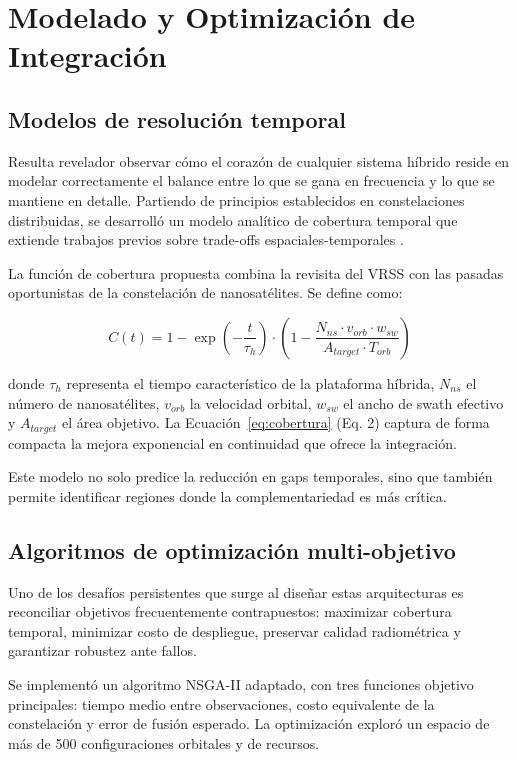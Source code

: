 \section{Modelado y Optimización de Integración}

\subsection{Modelos de resolución temporal}

Resulta revelador observar cómo el corazón de cualquier sistema híbrido reside en modelar correctamente el balance entre lo que se gana en frecuencia y lo que se mantiene en detalle. Partiendo de principios establecidos en constelaciones distribuidas, se desarrolló un modelo analítico de cobertura temporal que extiende trabajos previos sobre trade-offs espaciales-temporales \cite{BussyVirat2018}.

La función de cobertura propuesta combina la revisita del VRSS con las pasadas oportunistas de la constelación de nanosatélites. Se define como:

\begin{equation}
C(t) = 1 - \exp\left(-\frac{t}{\tau_{h}}\right) \cdot \left(1 - \frac{N_{ns} \cdot v_{orb} \cdot w_{sw}}{A_{target} \cdot T_{orb}}\right)
\label{eq:cobertura}
\end{equation}

donde $\tau_{h}$ representa el tiempo característico de la plataforma híbrida, $N_{ns}$ el número de nanosatélites, $v_{orb}$ la velocidad orbital, $w_{sw}$ el ancho de swath efectivo y $A_{target}$ el área objetivo. La Ecuación~\eqref{eq:cobertura} (Eq. 2) captura de forma compacta la mejora exponencial en continuidad que ofrece la integración.

Este modelo no solo predice la reducción en gaps temporales, sino que también permite identificar regiones donde la complementariedad es más crítica.

\subsection{Algoritmos de optimización multi-objetivo}

Uno de los desafíos persistentes que surge al diseñar estas arquitecturas es reconciliar objetivos frecuentemente contrapuestos: maximizar cobertura temporal, minimizar costo de despliegue, preservar calidad radiométrica y garantizar robustez ante fallos. 

Se implementó un algoritmo NSGA-II adaptado, con tres funciones objetivo principales: tiempo medio entre observaciones, costo equivalente de la constelación y error de fusión esperado. La optimización exploró un espacio de más de 500 configuraciones orbitales y de recursos. 

